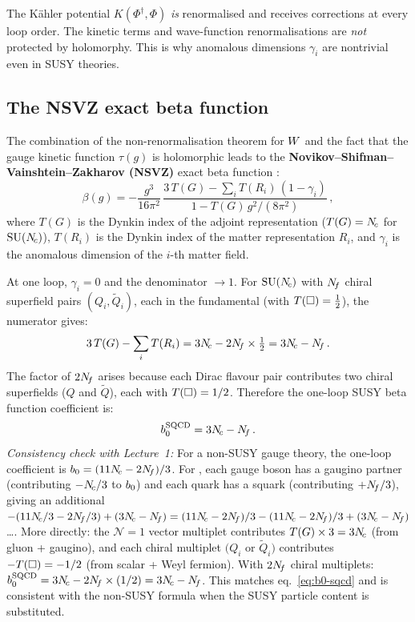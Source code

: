 \documentclass[11pt,a4paper]{article}
\begin{document}
\begin{remark}
The K\"ahler potential $K(\Phi^\dagger, \Phi)$ \emph{is} renormalised
and receives corrections at every loop order.  The kinetic terms and
wave-function renormalisations are \emph{not} protected by holomorphy.
This is why anomalous dimensions $\gamma_i$ are nontrivial even in
SUSY theories.
\end{remark}


\subsection{The NSVZ exact beta function}
\label{sec:NSVZ}

The combination of the non-renormalisation theorem for $W$ and the
fact that the gauge kinetic function $\tau(g)$ is holomorphic leads to
the \textbf{Novikov--Shifman--Vainshtein--Zakharov (NSVZ)} exact beta
function \cite{NSVZ1983,NSVZ1986}:
\begin{equation}
  \boxed{
    \beta(g) = -\frac{g^3}{16\pi^2}\,
    \frac{3\,T(G) - \sum_i T(R_i)\,(1 - \gamma_i)}
         {1 - T(G)\, g^2/(8\pi^2)}\,,
  }
  \label{eq:NSVZ}
\end{equation}
where $T(G)$ is the Dynkin index of the adjoint representation
($T(G) = N_{\!c}$ for $\mathrm{SU}(N_{\!c})$), $T(R_i)$ is the Dynkin index
of the matter representation $R_i$, and $\gamma_i$ is the anomalous
dimension of the $i$-th matter field.

\begin{remark}
\label{rem:NSVZ-oneloop}
At one loop, $\gamma_i = 0$ and the denominator $\to 1$.
For $\mathrm{SU}(N_{\!c})$ with $N_{\!f}$ chiral superfield pairs
$(Q_i, \widetilde{Q}_i)$, each in the fundamental (with
$T(\square) = \tfrac{1}{2}$), the numerator gives:
\begin{equation}
  3\,T(G) - \sum_i T(R_i) = 3N_{\!c} - 2N_{\!f} \times \tfrac{1}{2} = 3N_{\!c} - N_{\!f}\,.
  \label{eq:NSVZ-oneloop-num}
\end{equation}
The factor of $2N_{\!f}$ arises because each Dirac flavour pair contributes
two chiral superfields ($Q$ and $\widetilde{Q}$), each with
$T(\square) = 1/2$.  Therefore the one-loop SUSY beta function coefficient
is:
\begin{equation}
  b_0^{\mathrm{SQCD}} = 3N_{\!c} - N_{\!f}\,.
  \label{eq:b0-sqcd}
\end{equation}
\textit{Consistency check with Lecture~1:}
For a non-SUSY gauge theory, the one-loop coefficient is
$b_0 = (11N_{\!c} - 2N_{\!f})/3$.  For \SQCD{}, each gauge boson has
a gaugino partner (contributing $-N_{\!c}/3$ to $b_0$) and each
quark has a squark (contributing $+N_{\!f}/3$), giving an additional
$-(11\Nc/3 - 2\Nf/3) + (3\Nc - \Nf) = (11\Nc - 2\Nf)/3 - (11\Nc - 2\Nf)/3 + (3\Nc - \Nf)$\ldots.  More directly: the $\mathcal{N}=1$ vector multiplet
contributes $T(G) \times 3 = 3N_{\!c}$ (from gluon + gaugino), and
each chiral multiplet $(Q_i$ or $\widetilde{Q}_i)$ contributes
$-T(\square) = -1/2$ (from scalar + Weyl fermion).  With $2N_{\!f}$
chiral multiplets: $b_0^{\mathrm{SQCD}} = 3N_{\!c} - 2N_{\!f} \times (1/2) = 3N_{\!c} - N_{\!f}$.
This matches eq.~\eqref{eq:b0-sqcd} and is consistent with the
non-SUSY formula when the SUSY particle content is substituted.
\end{remark}
\end{document}
